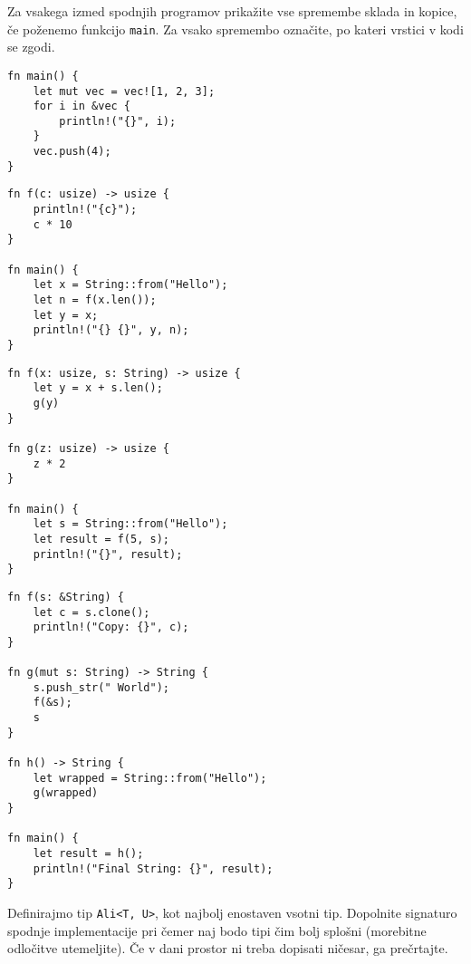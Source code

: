 \documentclass[11pt]{../izpit}
\begin{document}


\naloga[\tocke{10}]

Za vsakega izmed spodnjih programov prikažite vse spremembe sklada in kopice, če poženemo funkcijo \texttt{main}. Za vsako spremembo označite, po kateri vrstici v kodi se zgodi.

\podnaloga
\begin{verbatim}
fn main() {
    let mut vec = vec![1, 2, 3];
    for i in &vec {
        println!("{}", i);
    }
    vec.push(4);
}
\end{verbatim}

\podnaloga
\begin{verbatim}
fn f(c: usize) -> usize {
    println!("{c}");
    c * 10
}

fn main() {
    let x = String::from("Hello");
    let n = f(x.len());
    let y = x;
    println!("{} {}", y, n);
}
\end{verbatim}

\podnaloga
\begin{verbatim}
fn f(x: usize, s: String) -> usize {
    let y = x + s.len();
    g(y)
}

fn g(z: usize) -> usize {
    z * 2
}

fn main() {
    let s = String::from("Hello");
    let result = f(5, s);
    println!("{}", result);
}
\end{verbatim}

\podnaloga
\begin{verbatim}
fn f(s: &String) {
    let c = s.clone();
    println!("Copy: {}", c);
}

fn g(mut s: String) -> String {
    s.push_str(" World");
    f(&s);
    s
}

fn h() -> String {
    let wrapped = String::from("Hello");
    g(wrapped)
}

fn main() {
    let result = h();
    println!("Final String: {}", result);
}

\end{verbatim}



\naloga[\tocke{20}]

Definirajmo tip \texttt{Ali<T, U>}, kot najbolj enostaven vsotni tip. Dopolnite signaturo spodnje implementacije pri čemer naj bodo tipi čim bolj splošni (morebitne odločitve utemeljite). Če v dani prostor ni treba dopisati ničesar, ga prečrtajte.
\end{document}

